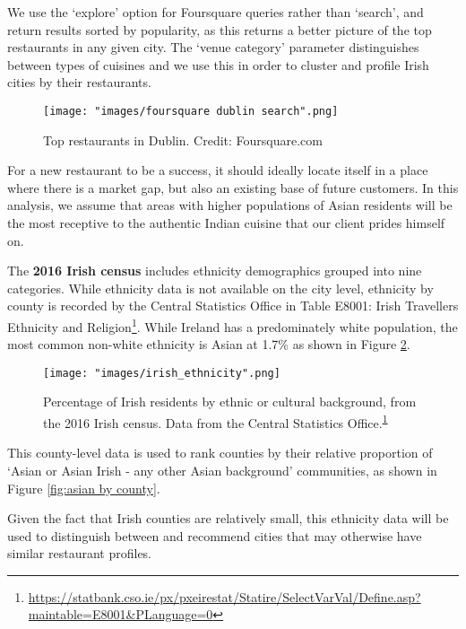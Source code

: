 \documentclass[a4paper,11pt]{article}
\begin{document}
We use the `explore' option for Foursquare queries rather than `search', and return results sorted by popularity, as this returns a better picture of the top restaurants in any given city. The `venue category' parameter distinguishes between types of cuisines and we use this in order to cluster and profile Irish cities by their restaurants.

\begin{figure}[htb]
   \centering
   \texttt{[image: "images/foursquare dublin search".png]}
      \caption{Top restaurants in Dublin. Credit: Foursquare.com}
      \label{fig:dublin foursquare}
\end{figure}

For a new restaurant to be a success, it should ideally locate itself in a place where there is a market gap, but also an existing base of future customers. In this analysis, we assume that areas with higher populations of Asian residents will be the most receptive to the authentic Indian cuisine that our client prides himself on. 

The \textbf{2016 Irish census} includes ethnicity demographics grouped into nine categories. While ethnicity data is not available on the city level, ethnicity by county is recorded by the Central Statistics Office in Table E8001: Irish Travellers Ethnicity and Religion\footnote{\url{https://statbank.cso.ie/px/pxeirestat/Statire/SelectVarVal/Define.asp?maintable=E8001&PLanguage=0}\label{footnote:irish ethnicity}}. While Ireland has a predominately white population, the most common non-white ethnicity is Asian at 1.7\% as shown in Figure \ref{fig:irish ethnicity}. 

\begin{figure}[htb]
   \centering
   \texttt{[image: "images/irish\_ethnicity".png]}
      \caption{Percentage of Irish residents by ethnic or cultural background, from the 2016 Irish census. Data from the Central Statistics Office.\textsuperscript{\ref{footnote:irish ethnicity}}}
      \label{fig:irish ethnicity}
\end{figure}

This county-level data is used to rank counties by their relative proportion of `Asian or Asian Irish - any other Asian background' communities, as shown in Figure \ref{fig:asian by county}.

Given the fact that Irish counties are relatively small, this ethnicity data will be used to distinguish between and recommend cities that may otherwise have similar restaurant profiles.
\end{document}
